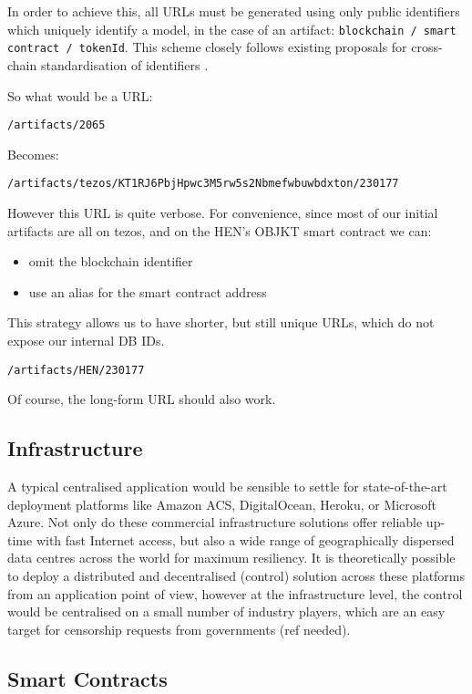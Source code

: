 In order to achieve this, all URLs must be generated using only public identifiers which uniquely identify a model, in the case of an artifact: \texttt{blockchain /  smart contract / tokenId}.
This scheme closely follows existing proposals for cross-chain standardisation of identifiers \cite{herzogAssetTypeAsset2020}.

So what would be a URL:

\texttt{/artifacts/2065}

Becomes:

\texttt{/artifacts/tezos/KT1RJ6PbjHpwc3M5rw5s2Nbmefwbuwbdxton/230177}


However this URL is quite verbose. For convenience, since most of our initial artifacts are all on tezos, and on the HEN's OBJKT smart contract we can:

\begin{itemize}
    \item omit the blockchain identifier
    \item use an alias for the smart contract address
\end{itemize}

This strategy allows us to have shorter, but still unique URLs, which do not expose our internal DB IDs.

\texttt{/artifacts/HEN/230177}

Of course, the long-form URL should also work.

\subsection{Infrastructure}

A typical centralised application would be sensible to settle for state-of-the-art deployment platforms like Amazon ACS, DigitalOcean, Heroku, or Microsoft Azure. Not only do these commercial infrastructure solutions offer reliable up-time with fast Internet access, but also a wide range of geographically dispersed data centres across the world for maximum resiliency. It is theoretically possible to deploy a distributed and decentralised (control) solution across these platforms from an application point of view, however at the infrastructure level, the control would be centralised on a small number of industry players, which are an easy target for censorship requests from governments (ref needed).

\subsection{Smart Contracts}


